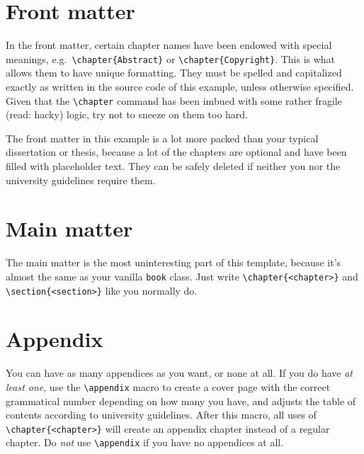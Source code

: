 \documentclass[dissertation]{msudissertation}
\begin{document}
\section{Front matter}

In the front matter, certain chapter names have been endowed with special meanings, e.g.\ \verb|\chapter{Abstract}| or \verb|\chapter{Copyright}|.  This is what allows them to have unique formatting.  They must be spelled and capitalized exactly as written in the source code of this example, unless otherwise specified.  Given that the \verb|\chapter| command has been imbued with some rather fragile (read: hacky) logic, try not to sneeze on them too hard.

The front matter in this example is a lot more packed than your typical dissertation or thesis, because a lot of the chapters are optional and have been filled with placeholder text.  They can be safely deleted if neither you nor the university guidelines require them.

\section{Main matter}

The main matter is the most uninteresting part of this template, because it's almost the same as your vanilla \texttt{book} class.  Just write \verb|\chapter{<chapter>}| and \verb|\section{<section>}| like you normally do.

\section{Appendix}

You can have as many appendices as you want, or none at all.  If you do have \emph{at least one}, use the \verb|\appendix| macro to create a cover page with the correct grammatical number depending on how many you have, and adjusts the table of contents according to university guidelines.  After this macro, all uses of \verb|\chapter{<chapter>}| will create an appendix chapter instead of a regular chapter.  Do \emph{not} use \verb|\appendix| if you have no appendices at all.
\end{document}
